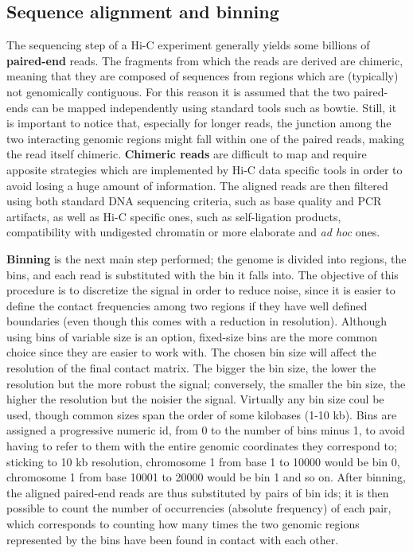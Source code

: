 \subsection{Sequence alignment and binning}
The sequencing step of a Hi-C experiment generally yields some billions of \textbf{paired-end} reads. The fragments from which the reads are derived are chimeric, meaning that they are composed of sequences from regions which are (typically) not genomically contiguous. For this reason it is assumed that the two paired-ends can be mapped independently using standard tools such as bowtie. Still, it is important to notice that, especially for longer reads, the junction among the two interacting genomic regions might fall within one of the paired reads, making the read itself chimeric. \textbf{Chimeric reads} are difficult to map and require apposite strategies which are implemented by Hi-C data specific tools in order to avoid losing a huge amount of information. The aligned reads are then filtered using both standard DNA sequencing criteria, such as base quality and PCR artifacts, as well as Hi-C specific ones, such as self-ligation products, compatibility with undigested chromatin\cite{readfiltering2013} or more elaborate and \emph{ad hoc} ones\cite{complexfiltering2017}.

\textbf{Binning} is the next main step performed; the genome is divided into regions, the bins, and each read is substituted with the bin it falls into. The objective of this procedure is to discretize the signal in order to reduce noise, since it is easier to define the contact frequencies among two regions if they have well defined boundaries (even though this comes with a reduction in resolution).
Although using bins of variable size is an option, fixed-size bins are the more common choice since they are easier to work with. The chosen bin size will affect the resolution of the final contact matrix. The bigger the bin size, the lower the resolution but the more robust the signal; conversely, the smaller the bin size, the higher the resolution but the noisier the signal. Virtually any bin size coul be used, though common sizes span the order of some kilobases (1-10 kb). Bins are assigned a progressive numeric id, from 0 to the number of bins minus 1, to avoid having to refer to them with the entire genomic coordinates they correspond to; sticking to 10 kb resolution, chromosome 1 from base 1 to 10000 would be bin 0, chromosome 1 from base 10001 to 20000 would be bin 1 and so on. After binning, the aligned paired-end reads are thus substituted by pairs of bin ids; it is then possible to count the number of occurrencies (absolute frequency) of each pair, which corresponds to counting how many times the two genomic regions represented by the bins have been found in contact with each other. 

